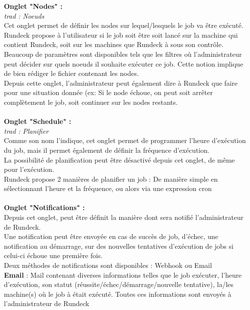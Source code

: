 \documentclass[12pt]{article}
\begin{document}
\textbf{Onglet "Nodes" :}
\\
\textit{trad : Noeuds}
\\
Cet onglet permet de définir les nodes sur lequel/lesquels le job va être exécuté. Rundeck propose à l'utilisateur si le job soit être soit lancé sur la machine qui contient Rundeck, soit sur les machines que Rundeck à sous son contrôle.
\\
Beaucoup de paramètres sont disponibles tels que les filtres où l'administrateur peut décider sur quels noeuds il souhaite exécuter ce job. Cette notion implique de bien rédiger le fichier contenant les nodes.
\\
Depuis cette onglet, l'administrateur peut également dire à Rundeck que faire pour une situation donnée (ex: Si le node échoue, on peut soit arrêter complètement le job, soit continuer sur les nodes restants.
\\
\vspace{0.2cm}
\\
\textbf{Onglet "Schedule" :}
\\
\textit{trad : Planifier}
\\
Comme son nom l'indique, cet onglet permet de programmer l'heure d'exécution du job, mais il permet également de définir la fréquence d'exécution.
\\
La possibilité de planification peut être désactivé depuis cet onglet, de même pour l'exécution.
\\
Rundeck propose 2 manières de planifier un job :  De manière simple en sélectionnant l'heure et la fréquence, ou alors via une expression cron 
\\
\vspace{0.2cm}
\\
\textbf{Onglet "Notifications" :}
\\
Depuis cet onglet, peut être définit la manière dont sera notifié l'administrateur de Rundeck.
\\
Une notification peut être envoyée en cas de succès de job, d'échec, une notification au démarrage, sur des nouvelles tentatives d'exécution de jobs si celui-ci échoue une première fois.
\\
Deux méthodes de notifications sont disponibles : Webhook ou Email
\\
\textbf{Email} :  Mail contenant diverses informations telles que le job exécuter, l'heure d'exécution, son statut (réussite/échec/démarrage/nouvelle tentative), la/les machine(s) où le job à était exécuté. Toutes ces informations sont envoyés à l'administrateur de Rundeck
\end{document}
